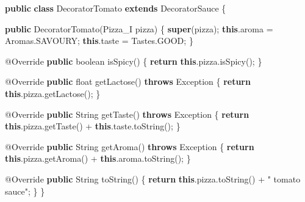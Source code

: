 \documentclass[french,]{article}
\newenvironment{Shaded}{}{}
\newcommand{\KeywordTok}[1]{\textcolor[rgb]{0.00,0.44,0.13}{\textbf{{#1}}}}
\newcommand{\DataTypeTok}[1]{\textcolor[rgb]{0.56,0.13,0.00}{{#1}}}
\newcommand{\StringTok}[1]{\textcolor[rgb]{0.25,0.44,0.63}{{#1}}}
\newcommand{\FunctionTok}[1]{\textcolor[rgb]{0.02,0.16,0.49}{{#1}}}
\newcommand{\NormalTok}[1]{{#1}}
\begin{document}
\begin{Shaded}
\begin{Highlighting}[]
\KeywordTok{public} \KeywordTok{class} \NormalTok{DecoratorTomato }\KeywordTok{extends} \NormalTok{DecoratorSauce \{}

    \KeywordTok{public} \FunctionTok{DecoratorTomato}\NormalTok{(Pizza_I pizza) \{}
        \KeywordTok{super}\NormalTok{(pizza);}
        \KeywordTok{this}\NormalTok{.}\FunctionTok{aroma} \NormalTok{= Aromas.}\FunctionTok{SAVOURY}\NormalTok{;}
        \KeywordTok{this}\NormalTok{.}\FunctionTok{taste} \NormalTok{= Tastes.}\FunctionTok{GOOD}\NormalTok{;}
    \NormalTok{\}}

    \FunctionTok{@Override}
    \KeywordTok{public} \DataTypeTok{boolean} \FunctionTok{isSpicy}\NormalTok{() \{}
        \KeywordTok{return} \KeywordTok{this}\NormalTok{.}\FunctionTok{pizza}\NormalTok{.}\FunctionTok{isSpicy}\NormalTok{();}
    \NormalTok{\}}

    \FunctionTok{@Override}
    \KeywordTok{public} \DataTypeTok{float} \FunctionTok{getLactose}\NormalTok{() }\KeywordTok{throws} \NormalTok{Exception \{}
        \KeywordTok{return} \KeywordTok{this}\NormalTok{.}\FunctionTok{pizza}\NormalTok{.}\FunctionTok{getLactose}\NormalTok{();}
    \NormalTok{\}}

    \FunctionTok{@Override}
    \KeywordTok{public} \NormalTok{String }\FunctionTok{getTaste}\NormalTok{() }\KeywordTok{throws} \NormalTok{Exception \{}
        \KeywordTok{return} \KeywordTok{this}\NormalTok{.}\FunctionTok{pizza}\NormalTok{.}\FunctionTok{getTaste}\NormalTok{() + }\KeywordTok{this}\NormalTok{.}\FunctionTok{taste}\NormalTok{.}\FunctionTok{toString}\NormalTok{();}
    \NormalTok{\}}

    \FunctionTok{@Override}
    \KeywordTok{public} \NormalTok{String }\FunctionTok{getAroma}\NormalTok{() }\KeywordTok{throws} \NormalTok{Exception \{}
        \KeywordTok{return} \KeywordTok{this}\NormalTok{.}\FunctionTok{pizza}\NormalTok{.}\FunctionTok{getAroma}\NormalTok{() + }\KeywordTok{this}\NormalTok{.}\FunctionTok{aroma}\NormalTok{.}\FunctionTok{toString}\NormalTok{();}
    \NormalTok{\}}

    \FunctionTok{@Override}
    \KeywordTok{public} \NormalTok{String }\FunctionTok{toString}\NormalTok{() \{}
        \KeywordTok{return} \KeywordTok{this}\NormalTok{.}\FunctionTok{pizza}\NormalTok{.}\FunctionTok{toString}\NormalTok{() + }\StringTok{" tomato sauce"}\NormalTok{;}
    \NormalTok{\}}
\NormalTok{\}}
\end{Highlighting}
\end{Shaded}
\end{document}
